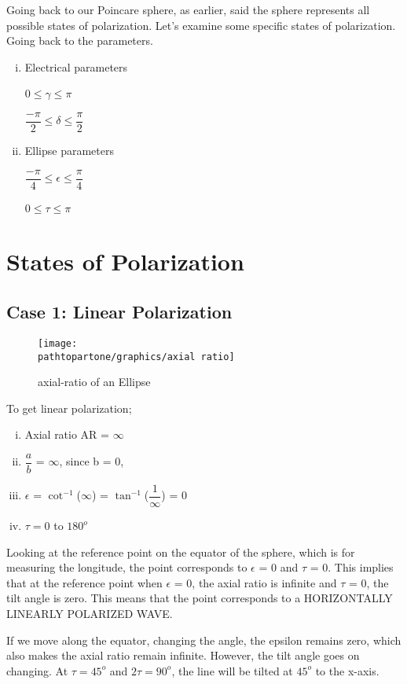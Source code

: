 Going back to our Poincare sphere, as earlier, said the sphere represents all possible states of polarization. Let's examine some specific states of polarization. Going back to the parameters.
\begin{enumerate}[(i)]
\item Electrical parameters 

0$\leq$$\gamma$$\leq$$\pi$

$\dfrac{-\pi}{2}$$\leq$$\delta$$\leq$$\dfrac{\pi}{2}$
\item Ellipse parameters

$\dfrac{-\pi}{4}$$\leq$$\epsilon$$\leq$$\dfrac{\pi}{4}$

0$\leq$$\tau$$\leq$$\pi$
\end{enumerate}

\section{States of Polarization}
\subsection{Case 1: Linear Polarization}

\begin{figure}[h]
\centering
\texttt{[image: \\pathtopartone/graphics/axial ratio]}
\caption{axial-ratio of an Ellipse}
\label{fig:axial-ratio}
\end{figure}

To get linear polarization;
\begin{enumerate}[(i)]
\item Axial ratio AR = $\infty$
\item $\dfrac{a}{b}$ = $\infty$, since b = 0,
\item $\epsilon$ = $\cot^{-1}$($\infty$) = $\tan^{-1}$($\dfrac{1}{\infty}$) = 0
\item $\tau = 0  $ to $  180^{o} $
\end{enumerate}
Looking at the reference point on the equator of the sphere, which is for measuring the longitude, the point corresponds to $\epsilon$ = 0 and $\tau$ = 0. This implies that at the reference point when $\epsilon$ = 0, the axial ratio is infinite and $\tau$ = 0, the tilt angle is zero. This means that the point corresponds to a HORIZONTALLY LINEARLY POLARIZED WAVE.

If we move along the equator, changing the angle, the epsilon remains zero, which also makes the axial ratio remain infinite. However, the tilt angle goes on changing. At $\tau = 45^{o}$ and $2\tau = 90^{o}$, the line will be tilted at $45^{o}$ to the x-axis.

